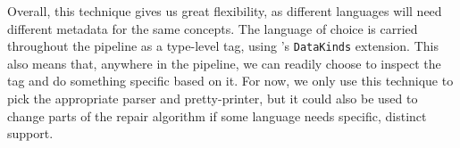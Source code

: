 Overall, this technique gives us great flexibility, as different languages will
need different metadata for the same concepts.  The language of choice is
carried throughout the \Chick{} pipeline as a type-level tag, using \Haskell{}'s
\texttt{DataKinds} extension.  This also means that, anywhere in
the pipeline, we can readily choose to inspect the tag and do something specific
based on it.  For now, we only use this technique to pick the appropriate parser
and pretty-printer, but it could also be used to change parts of the repair
algorithm if some language needs specific, distinct support.

